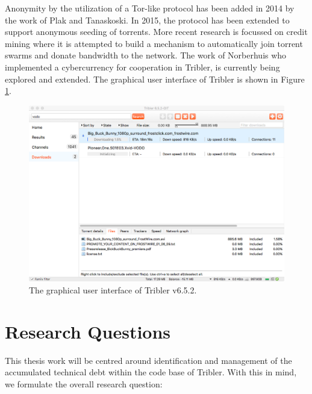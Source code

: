 \noindent Anonymity by the utilization of a Tor-like protocol has been added in 2014 by the work of Plak\cite{plak2014anonymous} and Tanaskoski\cite{tanaskoski2014anonymous}. 
In 2015, the protocol has been extended to support anonymous seeding of torrents\cite{ruigrok2015bittorrent}.
More recent research is focussed on credit mining where it is attempted to build a mechanism to automatically join torrent swarms and donate bandwidth to the network. The work of Norberhuis\cite{norberhuis2015multichain} who implemented a cybercurrency for cooperation in Tribler, is currently being explored and extended.
The graphical user interface of Tribler is shown in Figure \ref{fig:tribler-interface}.\\

\begin{figure}[h!]
	\centering
	\includegraphics[width=1.0\columnwidth]{images/introduction/tribler_interface}
	\caption{The graphical user interface of Tribler v6.5.2.}
	\label{fig:tribler-interface}
\end{figure}

\section{Research Questions}
This thesis work will be centred around identification and management of the accumulated technical debt within the code base of Tribler. With this in mind, we formulate the overall research question:\\

\noindent{}\\

